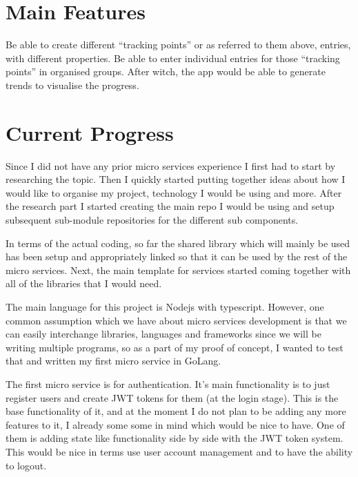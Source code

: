 \documentclass[11pt]{article}
\begin{document}
\section{Main Features}

Be able to create different ``tracking points'' or as referred to them above, entries, with different properties. Be able to enter individual entries for those ``tracking points'' in organised groups. After witch, the app would be able to generate trends to visualise the progress. \par

\section{Current Progress}

Since I did not have any prior micro services experience I first had to start by researching the topic. Then I quickly started putting together ideas about how I would like to organise my project, technology I would be using and more. After the research part I started creating the main repo I would be using and setup subsequent sub-module repositories for the different sub components. \par

In terms of the actual coding, so far the shared library which will mainly be used has been setup and appropriately linked so that it can be used by the rest of the micro services. Next, the main template for services started coming together with all of the libraries that I would need. \par

The main language for this project is Nodejs with typescript. However, one common assumption which we have about micro services development is that we can easily interchange libraries, languages and frameworks since we will be writing multiple programs, so as a part of my proof of concept, I wanted to test that and written my first micro service in GoLang. \par

The first micro service is for authentication. It's main functionality is to just register users and create JWT tokens for them (at the login stage). This is the base functionality of it, and at the moment I do not plan to be adding any more features to it, I already some some in mind which would be nice to have. One of them is adding state like functionality side by side with the JWT token system. This would be nice in terms use user account management and to have the ability to logout. \par
\end{document}
